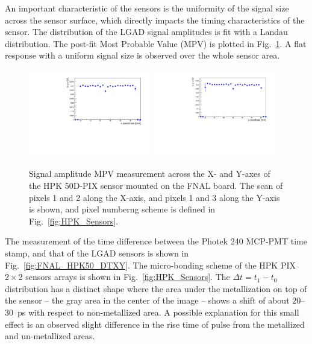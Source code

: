 \documentclass[preprint,1p]{elsarticle}
\begin{document}
An important characteristic of the sensors is the uniformity of the signal size
across the sensor surface, which directly impacts the timing characteristics of
the sensor. The distribution of the LGAD signal amplitudes is fit with a Landau
distribution. The post-fit Most Probable Value (MPV) is
plotted in Fig.~\ref{fig:FNAL_HPK50_MPVXY}. A flat response with a uniform
signal size is observed over the whole sensor area.

\begin{figure}[htbp] 
\centering
\includegraphics[width=0.48\textwidth]{figs/FNALBoard_HPK50DPix_Run847-891/MPV_vs_X_Ch4_5.pdf} 
\includegraphics[width=0.48\textwidth]{figs/FNALBoard_HPK50DPix_Run847-891/MPV_vs_Y_Ch3_4.pdf} 
\caption{Signal amplitude MPV measurement across the X- and Y-axes of the HPK 50D-PIX sensor mounted on the FNAL board. The scan of pixels 1 and 2 along the X-axis, and pixels 1 and 3 along the Y-axis is shown, and pixel numberng scheme is defined in Fig.~\ref{fig:HPK_Sensors}.} 
\label{fig:FNAL_HPK50_MPVXY} 
\end{figure} 



The measurement of the time difference between the Photek 240 MCP-PMT time
stamp, and that of the LGAD sensors is shown in Fig.~\ref{fig:FNAL_HPK50_DTXY}.
The micro-bonding scheme of the HPK PIX $2\times 2$ sensors arrays is shown in
Fig.~\ref{fig:HPK_Sensors}. The $\Delta t = t_{1}-t_{0}$ distribution has a
distinct shape where the area under the metallization on top of the sensor -- the
gray area in the center of the image -- shows a shift of about $20$--$30$~ps with
respect to non-metallized area. A possible explanation for this small effect is
an observed slight difference in the rise time of pulse from the metallized and
un-metallized areas. 
\end{document}
